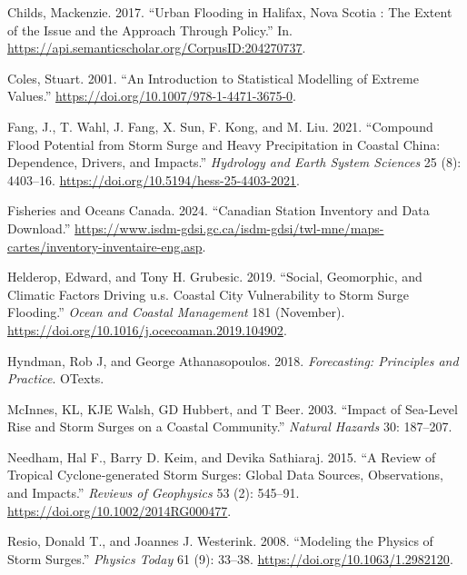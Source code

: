\documentclass[
  letterpaper,
  DIV=11,
  numbers=noendperiod]{scrartcl}
\newlength{\cslhangindent}
\newenvironment{CSLReferences}[2] %
 {\begin{list}{}{%
  \setlength{\itemindent}{0pt}
  \setlength{\leftmargin}{0pt}
  \setlength{\parsep}{0pt}
  \ifodd #1
   \setlength{\leftmargin}{\cslhangindent}
   \setlength{\itemindent}{-1\cslhangindent}
  \fi
  \setlength{\itemsep}{#2\baselineskip}}}
 {\end{list}}
\begin{document}
\label{refs}
\begin{CSLReferences}{1}{0}
Childs, Mackenzie. 2017. {``Urban Flooding in Halifax, Nova Scotia : The
Extent of the Issue and the Approach Through Policy.''} In.
\url{https://api.semanticscholar.org/CorpusID:204270737}.

Coles, Stuart. 2001. {``{A}n {I}ntroduction to {S}tatistical {M}odelling
of {E}xtreme {V}alues.''}
\url{https://doi.org/10.1007/978-1-4471-3675-0}.

Fang, J., T. Wahl, J. Fang, X. Sun, F. Kong, and M. Liu. 2021.
{``Compound Flood Potential from Storm Surge and Heavy Precipitation in
Coastal China: Dependence, Drivers, and Impacts.''} \emph{Hydrology and
Earth System Sciences} 25 (8): 4403--16.
\url{https://doi.org/10.5194/hess-25-4403-2021}.

Fisheries and Oceans Canada. 2024. {``Canadian Station Inventory and
Data Download.''}
\url{https://www.isdm-gdsi.gc.ca/isdm-gdsi/twl-mne/maps-cartes/inventory-inventaire-eng.asp}.

Helderop, Edward, and Tony H. Grubesic. 2019. {``Social, Geomorphic, and
Climatic Factors Driving u.s. Coastal City Vulnerability to Storm Surge
Flooding.''} \emph{Ocean and Coastal Management} 181 (November).
\url{https://doi.org/10.1016/j.ocecoaman.2019.104902}.

Hyndman, Rob J, and George Athanasopoulos. 2018. \emph{Forecasting:
Principles and Practice}. OTexts.

McInnes, KL, KJE Walsh, GD Hubbert, and T Beer. 2003. {``Impact of
Sea-Level Rise and Storm Surges on a Coastal Community.''} \emph{Natural
Hazards} 30: 187--207.

Needham, Hal F., Barry D. Keim, and Devika Sathiaraj. 2015. {``A Review
of Tropical Cyclone‐generated Storm Surges: Global Data Sources,
Observations, and Impacts.''} \emph{Reviews of Geophysics} 53 (2):
545--91. \url{https://doi.org/10.1002/2014RG000477}.

Resio, Donald T., and Joannes J. Westerink. 2008. {``Modeling the
Physics of Storm Surges.''} \emph{Physics Today} 61 (9): 33--38.
\url{https://doi.org/10.1063/1.2982120}.


\end{CSLReferences}
\end{document}
